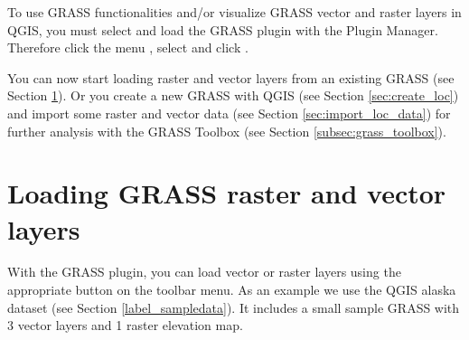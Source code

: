 To use GRASS functionalities and/or visualize GRASS vector and raster layers
in QGIS, you must select and load the GRASS plugin with the Plugin Manager.
Therefore click the menu  \arrow {},
select  and click .

You can now start loading raster and vector layers from an existing GRASS
 (see Section \ref{sec:load_grassdata}). Or you create a
new GRASS  with QGIS (see Section \ref{sec:create_loc})
and import some raster and vector data (see Section \ref{sec:import_loc_data})
for further analysis with the GRASS Toolbox (see Section
\ref{subsec:grass_toolbox}).

\section{Loading GRASS raster and vector layers}\label{sec:load_grassdata}

With the GRASS plugin, you can load vector or raster layers using the
appropriate button on the toolbar menu. As an example we use the QGIS alaska
dataset (see Section \ref{label_sampledata}). It includes a small sample
GRASS  with 3 vector layers and 1 raster elevation map.

